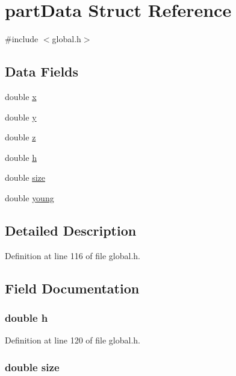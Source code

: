 \hypertarget{structpartData}{\section{part\-Data Struct Reference}
\label{structpartData}
}


{\ttfamily \#include $<$global.\-h$>$}

\subsection*{Data Fields}
\begin{DoxyCompactItemize}
\item 
double \hyperlink{structpartData_af88b946fb90d5f08b5fb740c70e98c10}{x}
\item 
double \hyperlink{structpartData_ab927965981178aa1fba979a37168db2a}{y}
\item 
double \hyperlink{structpartData_ab3e6ed577a7c669c19de1f9c1b46c872}{z}
\item 
double \hyperlink{structpartData_a8ee9be1b5aa75abae556de3088cba6d9}{h}
\item 
double \hyperlink{structpartData_aba3c5d750d5dbd6e86c11ecaca62885e}{size}
\item 
double \hyperlink{structpartData_a47ec3689b1fd89ba8e75d9a9975ba63f}{young}
\end{DoxyCompactItemize}


\subsection{Detailed Description}


Definition at line 116 of file global.\-h.



\subsection{Field Documentation}
\hypertarget{structpartData_a8ee9be1b5aa75abae556de3088cba6d9}{
\subsubsection[{h}]{\setlength{\rightskip}{0pt plus 5cm}double h}}\label{structpartData_a8ee9be1b5aa75abae556de3088cba6d9}


Definition at line 120 of file global.\-h.

\hypertarget{structpartData_aba3c5d750d5dbd6e86c11ecaca62885e}{
\subsubsection[{size}]{\setlength{\rightskip}{0pt plus 5cm}double size}}\label{structpartData_aba3c5d750d5dbd6e86c11ecaca62885e}


